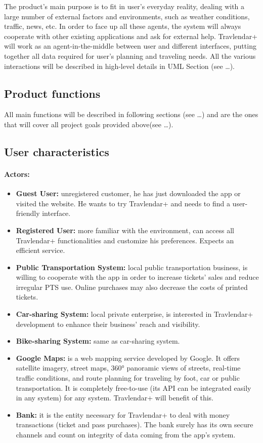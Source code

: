 \documentclass{article}
\begin{document}
The product’s main purpose is to fit in user’s everyday reality, dealing with a large number of external factors and environments, such as weather conditions, traffic, news, etc. In order to face up all these agents, the system will always cooperate with other existing applications and ask for external help. Travlendar+ will work as an agent-in-the-middle between user and different interfaces, putting together all data required for user’s planning and traveling needs. All the various interactions will be described in high-level details in UML Section (see …). 
\subsection{Product functions}
All main functions will be described in following sections (see …) and are the ones that will cover all project goals provided above(see …). 
\subsection{User characteristics}
\paragraph{Actors:}
\begin{itemize}
\item \textbf{Guest User:} unregistered customer, he has just downloaded the app or visited the website. He wants to try Travlendar+ and needs to find a user-friendly interface.
\item \textbf{Registered User:} more familiar with the environment, can access all Travlendar+ functionalities and customize his preferences. Expects an efficient service.
\item \textbf{Public Transportation System:} local public transportation business, is willing to cooperate with the app in order to increase tickets’ sales and reduce irregular PTS use. Online purchases may also decrease the costs of printed tickets. 
\item \textbf{Car-sharing System:} local private enterprise, is interested in Travlendar+ development to enhance their business’ reach and visibility. 
\item \textbf{Bike-sharing System:} same as car-sharing system.
\item \textbf{Google Maps:} is a web mapping service developed by Google. It offers satellite imagery, street maps, 360° panoramic views of streets, real-time traffic conditions, and route planning for traveling by foot, car or public transportation. It is completely free-to-use (its API can be integrated easily in any system) for any system. Travlendar+ will benefit of this.
\item \textbf{Bank:} it is the entity necessary for Travlendar+ to deal with money transactions (ticket and pass purchases). The bank surely has its own secure channels and count on integrity of data coming from the app’s system.
\end{itemize}
\end{document}
